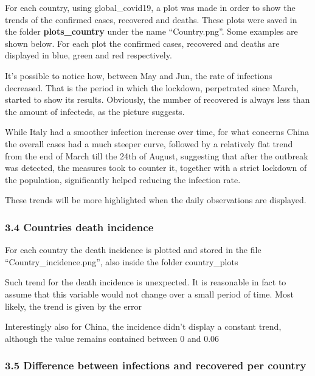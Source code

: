 \documentclass[11pt]{article}
\begin{document}
For each country, using global\_covid19, a plot was made in order to
show the trends of the confirmed cases, recovered and deaths. These
plots were saved in the folder \textbf{plots\_country} under the name
``Country.png''. Some examples are shown below. For each plot the
confirmed cases, recovered and deaths are displayed in blue, green and
red respectively.

It's possible to notice how, between May and Jun, the rate of infections
decreased. That is the period in which the lockdown, perpetrated since
March, started to show its results. Obviously, the number of recovered
is always less than the amount of infecteds, as the picture suggests.

While Italy had a smoother infection increase over time, for what
concerns China the overall cases had a much steeper curve, followed by a
relatively flat trend from the end of March till the 24th of August,
suggesting that after the outbreak was detected, the measures took to
counter it, together with a strict lockdown of the population,
significantly helped reducing the infection rate.

These trends will be more highlighted when the daily observations are
displayed.

\hypertarget{countries-death-incidence}{%
\subsubsection{3.4 Countries death
incidence}\label{countries-death-incidence}}

For each country the death incidence is plotted and stored in the file
``Country\_incidence.png'', also inside the folder country\_plots

Such trend for the death incidence is unexpected. It is reasonable in
fact to assume that this variable would not change over a small period
of time. Most likely, the trend is given by the error

Interestingly also for China, the incidence didn't display a constant
trend, although the value remains contained between 0 and 0.06

\hypertarget{difference-between-infections-and-recovered-per-country}{%
\subsubsection{3.5 Difference between infections and recovered per
country}\label{difference-between-infections-and-recovered-per-country}}
\end{document}

